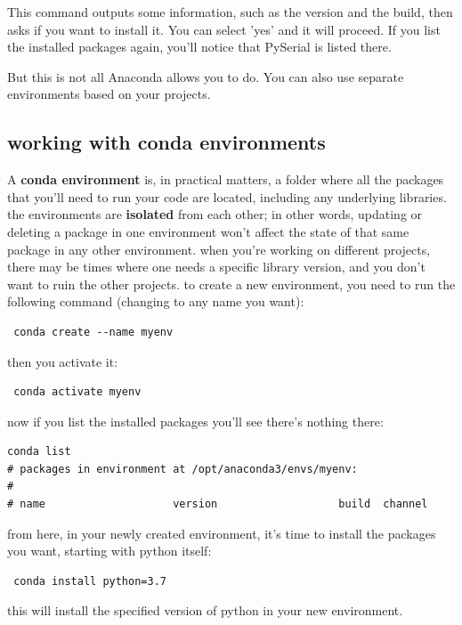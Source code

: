 This command outputs some information, such as the version and the build, then asks if you want to install it. You can select 'yes' and it will proceed. If you list the installed packages again, you'll notice that PySerial is listed there.

But this is not all Anaconda allows you to do. You can also use separate environments based on your projects.

\subsection{working with conda environments}\label{subsec:conda-environments}
A \textbf{conda environment} is, in practical matters, a folder where all the packages that you'll need to run your code are located, including any underlying libraries. the environments are \textbf{isolated} from each other; in other words, updating or deleting a package in one environment won't affect the state of that same package in any other environment. when you're working on different projects, there may be times where one needs a specific library version, and you don't want to ruin the other projects. to create a new environment, you need to run the following command (changing  to any name you want):

\begin{verbatim}
 conda create --name myenv
\end{verbatim}

then you activate it:

\begin{verbatim}
 conda activate myenv
\end{verbatim}

now if you list the installed packages you'll see there's nothing there:

\begin{verbatim}
conda list
# packages in environment at /opt/anaconda3/envs/myenv:
#
# name                    version                   build  channel
\end{verbatim}

from here, in your newly created environment, it's time to install the packages you want, starting with python itself:

\begin{verbatim}
 conda install python=3.7
\end{verbatim}

this will install the specified version of python in your new environment.


